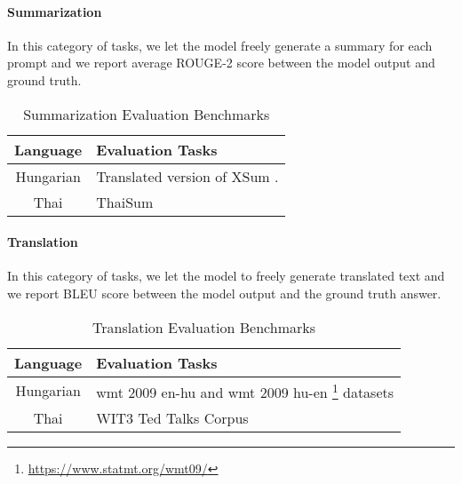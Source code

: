 \paragraph{Summarization} In this category of tasks, we let the model freely generate a summary for each prompt and we report average ROUGE-2 score between the model output and ground truth. 

\begin{table}[!h]
\centering
\caption{Summarization Evaluation Benchmarks}
\label{tab:table-label}
\begin{tabular}{|c|m{}|}
\hline
\textbf{Language} & \textbf{Evaluation Tasks} \\
\hline
Hungarian & Translated version of XSum \cite{narayan2018dont}. \\
\hline
Thai &  ThaiSum \cite{chumpolsathien_2020} \\
\hline
\end{tabular}
\end{table}


\paragraph{Translation} In this category of tasks, we let the model to freely generate translated text and we report BLEU score between the model output and the ground truth answer. 

\begin{table}[!h]
\centering
\caption{Translation Evaluation Benchmarks}
\label{tab:table-label}
\begin{tabular}{|c|m{}|}
\hline
\textbf{Language} & \textbf{Evaluation Tasks} \\
\hline
Hungarian & wmt 2009 en-hu and wmt 2009 hu-en \footnote{\href{https://www.statmt.org/wmt09/}{https://www.statmt.org/wmt09/}} datasets \\
\hline
Thai & WIT3 Ted Talks Corpus \cite{cettolo-etal-2012-wit3} \\
\hline
\end{tabular}
\end{table}
